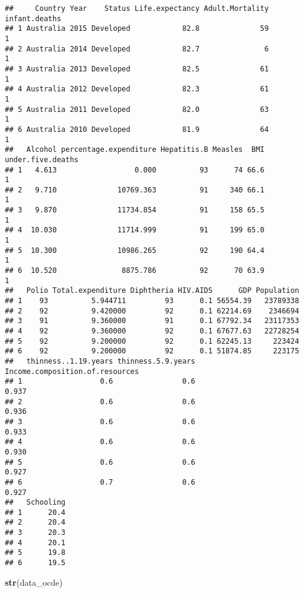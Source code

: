 \documentclass[
]{article}
\newenvironment{Shaded}{\begin{snugshade}}{\end{snugshade}}
\newcommand{\FunctionTok}[1]{\textcolor[rgb]{0.13,0.29,0.53}{\textbf{#1}}}
\newcommand{\NormalTok}[1]{#1}
\begin{document}
\begin{verbatim}
##     Country Year    Status Life.expectancy Adult.Mortality infant.deaths
## 1 Australia 2015 Developed            82.8              59             1
## 2 Australia 2014 Developed            82.7               6             1
## 3 Australia 2013 Developed            82.5              61             1
## 4 Australia 2012 Developed            82.3              61             1
## 5 Australia 2011 Developed            82.0              63             1
## 6 Australia 2010 Developed            81.9              64             1
##   Alcohol percentage.expenditure Hepatitis.B Measles  BMI under.five.deaths
## 1   4.613                  0.000          93      74 66.6                 1
## 2   9.710              10769.363          91     340 66.1                 1
## 3   9.870              11734.854          91     158 65.5                 1
## 4  10.030              11714.999          91     199 65.0                 1
## 5  10.300              10986.265          92     190 64.4                 1
## 6  10.520               8875.786          92      70 63.9                 1
##   Polio Total.expenditure Diphtheria HIV.AIDS      GDP Population
## 1    93          5.944711         93      0.1 56554.39   23789338
## 2    92          9.420000         92      0.1 62214.69    2346694
## 3    91          9.360000         91      0.1 67792.34   23117353
## 4    92          9.360000         92      0.1 67677.63   22728254
## 5    92          9.200000         92      0.1 62245.13     223424
## 6    92          9.200000         92      0.1 51874.85     223175
##   thinness..1.19.years thinness.5.9.years Income.composition.of.resources
## 1                  0.6                0.6                           0.937
## 2                  0.6                0.6                           0.936
## 3                  0.6                0.6                           0.933
## 4                  0.6                0.6                           0.930
## 5                  0.6                0.6                           0.927
## 6                  0.7                0.6                           0.927
##   Schooling
## 1      20.4
## 2      20.4
## 3      20.3
## 4      20.1
## 5      19.8
## 6      19.5
\end{verbatim}

\begin{Shaded}
\begin{Highlighting}[]
\FunctionTok{str}\NormalTok{(data\_ocde)}
\end{Highlighting}
\end{Shaded}
\end{document}
